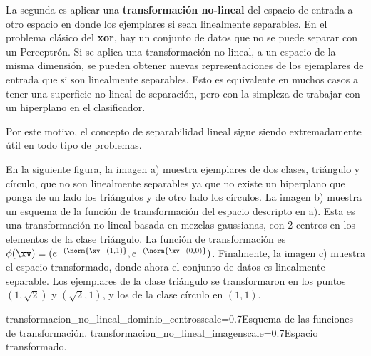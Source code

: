 
La segunda es aplicar una \textbf{transformación no-lineal} del espacio de entrada a otro espacio en donde los ejemplares si sean linealmente separables. En el problema clásico del \textbf{xor}, hay un conjunto de datos que no se puede separar con un Perceptrón. Si se aplica una transformación no lineal, a un espacio de la misma dimensión, se pueden obtener nuevas representaciones de los ejemplares de entrada que si son linealmente separables. Esto es equivalente en muchos casos a tener una superficie no-lineal de separación, pero con la simpleza de trabajar con un hiperplano en el clasificador.

Por este motivo, el concepto de separabilidad lineal sigue siendo extremadamente útil en todo tipo de problemas.

En la siguiente figura, la imagen a) muestra ejemplares de dos clases, triángulo y círculo, que no son linealmente separables ya que no existe un hiperplano que ponga de un lado los triángulos y de otro lado los círculos. La imagen b)
muestra un esquema de la función de transformación del espacio descripto en a). Esta es una transformación no-lineal basada en mezclas gaussianas, con 2 centros en los elementos de la clase triángulo. La función de transformación es $ \phi(\xv)= (e^{-( \norm{\xv -(1,1)}} , e^{-( \norm{\xv-(0,0)}} )$.  Finalmente, la imagen c) muestra el espacio transformado, donde ahora el conjunto de datos es linealmente separable. Los ejemplares de la clase triángulo se transformaron en los puntos $(1,\sqrt{2})$ y $(\sqrt{2},1)$, y los de la clase círculo en $(1,1)$. 

{transformacion_no_lineal_dominio_centros}{scale=0.7}{Esquema de las funciones de transformación.}
{transformacion_no_lineal_imagen}{scale=0.7}{Espacio transformado.}

